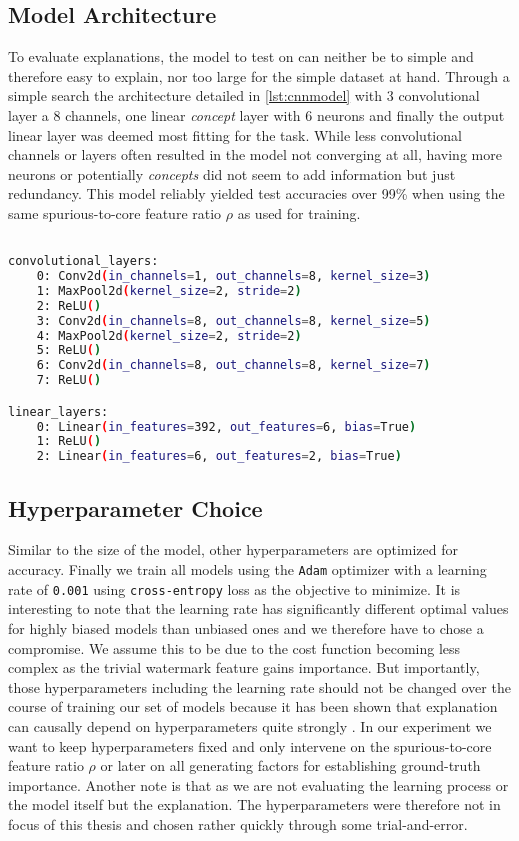 \subsection{Model Architecture}
To evaluate explanations, the model to test on can neither be to simple and therefore easy to explain, nor too large for the simple dataset at hand.
Through a simple search the architecture detailed in \autoref{lst:cnnmodel} with 3 convolutional layer a 8 channels, one linear \textit{concept} layer with 6 neurons and finally the output linear layer was deemed most fitting for the task. While less convolutional channels or layers often resulted in the model not converging at all, having more neurons or potentially \textit{concepts} did not seem to add information but just redundancy.
This model reliably yielded test accuracies over 99\% when using the same spurious-to-core feature ratio $\rho$ as used for training.

\begin{lstlisting}[language=bash, label=lst:cnnmodel]

convolutional_layers: 
    0: Conv2d(in_channels=1, out_channels=8, kernel_size=3)
    1: MaxPool2d(kernel_size=2, stride=2)
    2: ReLU()
    3: Conv2d(in_channels=8, out_channels=8, kernel_size=5)
    4: MaxPool2d(kernel_size=2, stride=2)
    5: ReLU()
    6: Conv2d(in_channels=8, out_channels=8, kernel_size=7)
    7: ReLU()

linear_layers:
    0: Linear(in_features=392, out_features=6, bias=True)
    1: ReLU()
    2: Linear(in_features=6, out_features=2, bias=True)  

\end{lstlisting}

\subsection{Hyperparameter Choice}
Similar to the size of the model, other hyperparameters are optimized for accuracy.
Finally we train all models using the \verb|Adam| optimizer  with a learning rate of \verb|0.001| using \verb|cross-entropy| loss  as the objective to minimize.
It is interesting to note that the learning rate has significantly different optimal values for highly biased models than unbiased ones and we therefore have to chose a compromise. We assume this to be due to the cost function becoming less complex as the trivial watermark feature gains importance.
But importantly, those hyperparameters including the learning rate should not be changed over the course of training our set of models because it has been shown that explanation can causally depend on hyperparameters quite strongly \cite{Karimi2023}. In our experiment we want to keep hyperparameters fixed and only intervene on the spurious-to-core feature ratio $\rho$ or later on all generating factors for establishing ground-truth importance. Another note is that as we are not evaluating the learning process or the model itself but the explanation. The hyperparameters were therefore not in focus of this thesis and chosen rather quickly through some trial-and-error.

